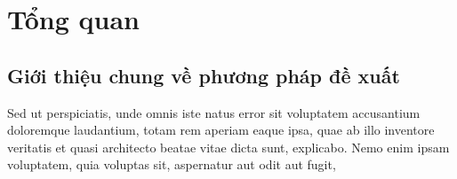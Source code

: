 
\chapter{Tổng quan}

\section{Giới thiệu chung về phương pháp đề xuất}

Sed ut perspiciatis, unde omnis iste natus error sit voluptatem accusantium doloremque laudantium, totam rem aperiam eaque ipsa, quae ab illo inventore veritatis et quasi architecto beatae vitae dicta sunt, explicabo. Nemo enim ipsam voluptatem, quia voluptas sit, aspernatur aut odit aut fugit, 